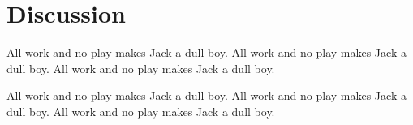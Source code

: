 
%
%

%
%

\section{Discussion}
\label{sec:discussion}

All work and no play makes Jack a dull boy.
All work and no play makes Jack a dull boy.
All work and no play makes Jack a dull boy.

All work and no play makes Jack a dull boy.
All work and no play makes Jack a dull boy.
All work and no play makes Jack a dull boy.





